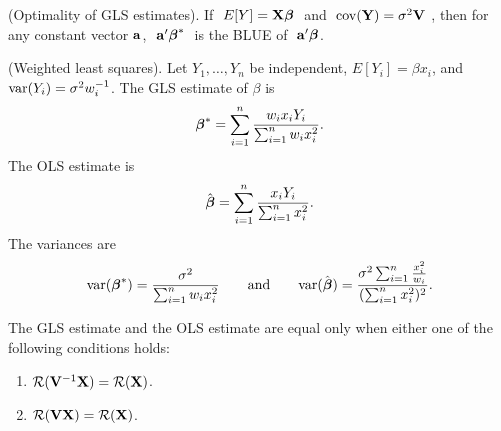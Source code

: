 \btheo 
(Optimality of GLS estimates).  If $\ E[Y]=\bfX\bfbet\ $ and $\
\mathrm{cov}(\mathbf{Y})=\sigma^2\mathbf{V}\ $, then for any constant vector $\mathbf{a}$, $\
\mathbf{a}'\mbox{\boldmath $\beta$}^*\ $ is the BLUE of $\ \bfa'\bfbet$.
\etheo

\bsexa
(Weighted least squares).  Let $Y_1,\ldots,Y_n$ be independent,
$E[Y_i]=\beta x_i$, and $\mathrm{var}(Y_i)=\sigma^2 w_i^{-1}$.  The GLS
estimate of $\beta$ is
$$
\mbox{\boldmath $\beta$}^*={\sum_{i=1}^n \frac{w_i x_i Y_i}{\sum_{i=1}^n w_i x_i^2}}.
$$
The OLS estimate is
$$
\hat{\mbox{\boldmath $\beta$}}={\sum_{i=1}^n \frac{x_i Y_i}{\sum_{i=1}^n x_i^2}}.
$$
The variances are
$$
\mathrm{var}(\mbox{\boldmath $\beta$}^*) = \frac{\sigma^2}{\sum_{i=1}^n w_i x_i^2}
\qquad
\mbox{and}
\qquad
\mathrm{var}(\hat{\mbox{\boldmath $\beta$}}) =  
\frac{\sigma^2 \sum_{i=1}^n \frac{x_i^2}{w_i}}{ 
(\sum_{i=1}^n x_i^2)^2}.
$$
\eexa

\bstheo
The GLS estimate and the OLS estimate are equal only when either one
of the following conditions holds:
\begin{enumerate}
\item ${\cal R}(\mathbf{V}^{-1}\mathbf{X})=\cal{R}(\mathbf{X})$.
\item ${\cal R}(\mathbf{V}\mathbf{X})=\cal{R}(\mathbf{X})$.
\end{enumerate}
\etheo
